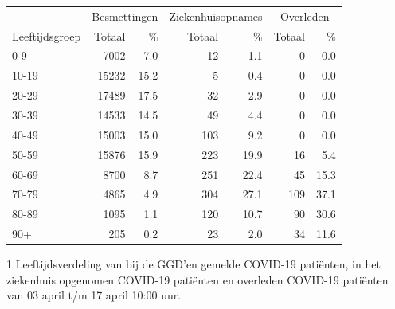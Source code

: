 \documentclass[
  english,
  man,floatsintext]{apa6}
\begin{document}
\begin{table}
\centering\begingroup\fontsize{11}{13}\selectfont

\begin{threeparttable}
\begin{tabular}{lrrrrrr}
\toprule
\multicolumn{1}{c}{ } & \multicolumn{2}{c}{Besmettingen} & \multicolumn{2}{c}{Ziekenhuisopnames} & \multicolumn{2}{c}{Overleden} \\
\cmidrule(l{3pt}r{3pt}){2-3} \cmidrule(l{3pt}r{3pt}){4-5} \cmidrule(l{3pt}r{3pt}){6-7}
Leeftijdsgroep & Totaal & \% & Totaal & \% & Totaal & \%\\
\midrule
0-9 & 7002 & 7.0 & 12 & 1.1 & 0 & 0.0\\
10-19 & 15232 & 15.2 & 5 & 0.4 & 0 & 0.0\\
20-29 & 17489 & 17.5 & 32 & 2.9 & 0 & 0.0\\
30-39 & 14533 & 14.5 & 49 & 4.4 & 0 & 0.0\\
40-49 & 15003 & 15.0 & 103 & 9.2 & 0 & 0.0\\
50-59 & 15876 & 15.9 & 223 & 19.9 & 16 & 5.4\\
60-69 & 8700 & 8.7 & 251 & 22.4 & 45 & 15.3\\
70-79 & 4865 & 4.9 & 304 & 27.1 & 109 & 37.1\\
80-89 & 1095 & 1.1 & 120 & 10.7 & 90 & 30.6\\
90+ & 205 & 0.2 & 23 & 2.0 & 34 & 11.6\\
\bottomrule
\end{tabular}
\begin{tablenotes}
\item[1] Leeftijdsverdeling van bij de GGD’en gemelde COVID-19 patiënten, in het ziekenhuis opgenomen COVID-19 patiënten en overleden COVID-19 patiënten van 03 april t/m 17 april 10:00 uur.
\end{tablenotes}
\end{threeparttable}
\endgroup{}
\end{table}

\newpage
\end{document}
